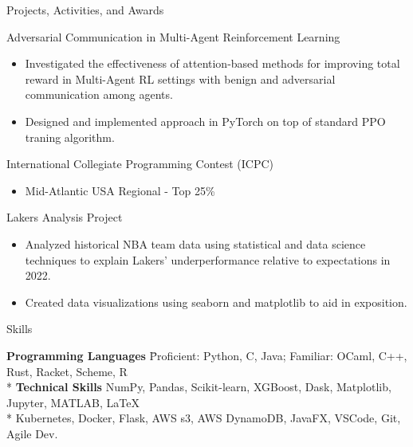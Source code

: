 \documentclass{article}
\newlength{\tabin}
\newlength{\secsep}
\newcommand{\lineunder}{\vspace*{-8pt} \\ \hspace*{-6pt} \hrulefill \\ \vspace*{-15pt}}
\newenvironment{tabbedsection}[1]{
  \begin{list}{}{
      \setlength{\itemsep}{0pt}
      \setlength{\labelsep}{0pt}
      \setlength{\labelwidth}{0pt}
      \setlength{\leftmargin}{\tabin}
      \setlength{\rightmargin}{\tabin}
      \setlength{\listparindent}{0pt}
      \setlength{\parsep}{0pt}
      \setlength{\parskip}{0pt}
      \setlength{\partopsep}{0pt}
      \setlength{\topsep}{#1}
    }
  \item[]
}{\end{list}}
\newenvironment{nospacetabbing}{
    \begin{tabbing}
}{\end{tabbing}\vspace{-1.2em}}
\newenvironment{resume_section}[1]{
  \filbreak
  \vspace{2\secsep}
  \textsc{\large#1}
  \lineunder
  \begin{tabbedsection}{\secsep}
}{\end{tabbedsection}}
\newenvironment{resume_subsection}[2][]{
  \textbf{#2} \hfill {\footnotesize #1} \hspace{-4em}
  \begin{tabbedsection}{0.5\secsep}
}{\end{tabbedsection}}
\newenvironment{subitems}{
  \renewcommand{\labelitemi}{-}
  \begin{itemize}
      \setlength{\labelsep}{1em}
}{\end{itemize}}
\begin{document}
\begin{resume_section}{Projects, Activities, and Awards}
  
  \begin{resume_subsection}{Adversarial Communication in Multi-Agent Reinforcement Learning}
    \begin{subitems}
      \item Investigated the effectiveness of attention-based methods for improving total reward
      in Multi-Agent RL settings with benign and adversarial communication among agents.
      \item Designed and implemented approach in PyTorch on top of standard PPO traning algorithm. 
    \end{subitems}
  \end{resume_subsection}

 \begin{resume_subsection}[Feb. 2023]{International Collegiate Programming Contest (ICPC)}
   \begin{subitems}
     \item Mid-Atlantic USA Regional - Top 25\%
   \end{subitems}
 \end{resume_subsection}

 \begin{resume_subsection}[]{Lakers Analysis Project}
  \begin{subitems}
  	\item Analyzed historical NBA team data using statistical and data science techniques to explain Lakers' underperformance relative to expectations in 2022.
  	\item Created data visualizations using seaborn and matplotlib to aid in exposition.
  \end{subitems}
  \end{resume_subsection}
  
\end{resume_section}

\begin{resume_section}{Skills}
  \begin{nospacetabbing}
  \textbf{Programming Languages} \= Proficient: Python, C, Java; Familiar: OCaml, C++, Rust, Racket, Scheme, R\\*
  \textbf{Technical Skills}  \> NumPy, Pandas, Scikit-learn, XGBoost, Dask, Matplotlib, Jupyter, MATLAB, \LaTeX \\ *
  \> Kubernetes, Docker, Flask, AWS s3, AWS DynamoDB, JavaFX, VSCode, Git, Agile Dev.

  \end{nospacetabbing}
\end{resume_section}
\end{document}
